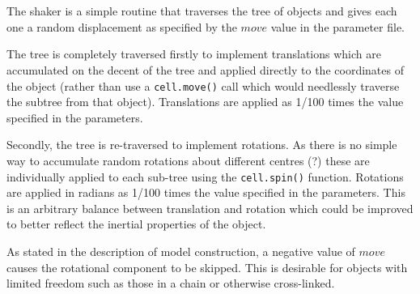 \section{}

The shaker is a simple routine that traverses the tree of objects and gives
each one a random displacement as specified by the $move$ value in the parameter file.

The tree is completely traversed firstly to implement translations which are accumulated
on the decent of the tree and applied directly to the coordinates of the object (rather than
use a {\tt cell.move()} call which would needlessly traverse the subtree from that object). 
Translations are applied as 1/100 times the value specified in the parameters.

Secondly, the tree is re-traversed to implement rotations.  As there is no simple way
to accumulate random rotations about different centres (?) these are individually applied
to each sub-tree using the {\tt cell.spin()} function.
Rotations are applied in radians as 1/100 times the value specified in the parameters.
This is an arbitrary balance between translation and rotation which could be improved
to better reflect the inertial properties of the object.

As stated in the description of model construction, a negative value of $move$ causes the
rotational component to be skipped.   This is desirable for objects with limited freedom
such as those in a chain or otherwise cross-linked.

